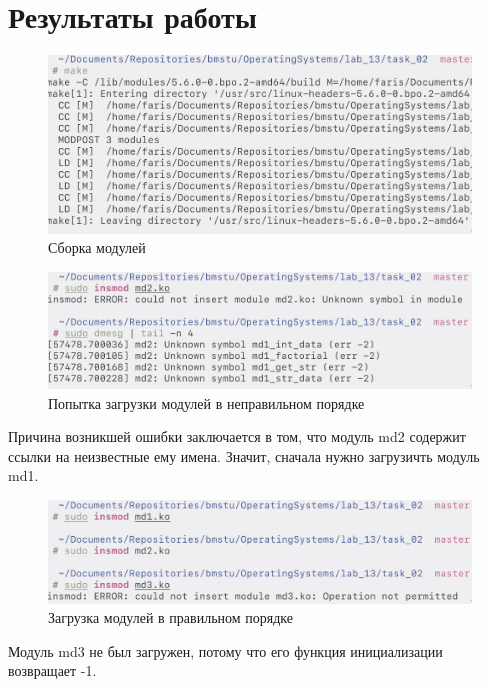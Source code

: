 \section{Результаты работы}
\begin{figure}[H]
    \centering
    \caption{Сборка модулей}
    \includegraphics[scale=0.4]{images/scr_11.png}
\end{figure}
\begin{figure}[H]
    \centering
    \caption{Попытка загрузки модулей в неправильном порядке}
    \includegraphics[scale=0.4]{images/scr_12.png}
\end{figure}

Причина возникшей ошибки заключается в том, что модуль md2 содержит ссылки на неизвестные ему имена. Значит, сначала нужно загрузичть модуль md1.

\begin{figure}[H]
    \centering
    \caption{Загрузка модулей в правильном порядке}
    \includegraphics[scale=0.4]{images/scr_13.png}
\end{figure}

Модуль md3 не был загружен, потому что его функция инициализации возвращает -1.


